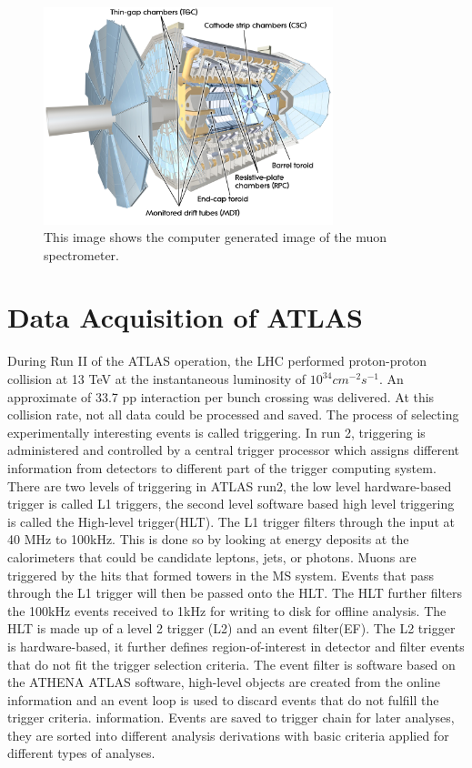 \begin{figure}[!htb]
    \begin{center}
        \includegraphics[width=0.75\textwidth]{figures/chapter_ATLAS/MuonSpectrometer}
        \caption{
		    This image shows the computer generated image of the muon spectrometer. \cite{Pequenao:1095929}
        }
        \label{fig:MuonSpectrometer}
    \end{center}
\end{figure}

\section{Data Acquisition of ATLAS}
During Run II of the ATLAS operation, the LHC performed proton-proton collision at 13 TeV at the instantaneous luminosity of $10^{34}cm^{-2}s^{-1}$. An approximate of 33.7 pp interaction per bunch crossing was delivered. 
At this collision rate, not all data could be processed and saved. The process of selecting experimentally interesting events is called triggering. In run 2, triggering is administered and controlled by a central trigger processor which assigns different information from detectors to different part of the trigger computing system. There are two levels of triggering in ATLAS run2, the low level hardware-based trigger is called L1 triggers, the second level software based high level triggering is called the High-level trigger(HLT). 
The L1 trigger filters through the input at 40 MHz to 100kHz. This is done so by looking at energy deposits at the calorimeters that could be
candidate leptons, jets, or photons. Muons are triggered by the hits that formed towers in the MS system. 
Events that pass through the L1 trigger will then be passed onto the HLT. The HLT further filters the 100kHz events received to 1kHz for writing to disk for offline analysis. The HLT is made  up of a level 2 trigger (L2) and an event filter(EF). The L2 trigger is hardware-based, it further defines region-of-interest in detector and filter events that do not fit the trigger selection criteria. The event filter is software based on the ATHENA ATLAS software, high-level objects are created from
the online information and an event loop is used to discard events that do not fulfill the trigger criteria.
information. 
Events are saved to trigger chain for later analyses, they are sorted into different analysis derivations with basic criteria applied for different types of analyses. 


